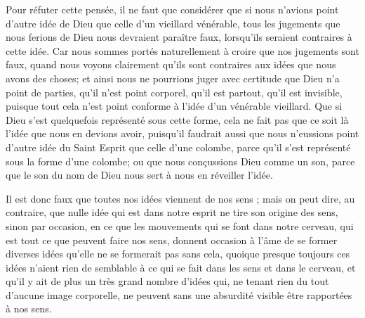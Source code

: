 Pour réfuter cette pensée, il ne faut que considérer que si nous n'avions point d'autre idée de Dieu que celle d'un vieillard vénérable, tous les jugements que nous ferions de Dieu nous devraient paraître faux, lorsqu'ils seraient contraires à cette idée. Car nous sommes portés naturellement à croire que nos jugements sont faux, quand nous voyons clairement qu'ils sont contraires aux idées que nous avons des choses; et ainsi nous ne pourrions juger avec certitude que Dieu n'a point de parties, qu'il n'est point corporel, qu'il est partout, qu'il est invisible, puisque tout cela n'est point conforme à l'idée d'un vénérable vieillard. Que si Dieu s'est quelquefois représenté sous cette forme, cela ne fait pas que ce soit là l'idée que nous en devions avoir, puisqu'il faudrait aussi que nous n'eussions point d'autre idée du Saint Esprit que celle d'une colombe, parce qu'il s'est représenté sous la forme d'une colombe; ou que nous conçussions Dieu comme un son, parce que le son du nom de Dieu nous sert à nous en réveiller l'idée.

Il est donc faux que toutes nos idées viennent de nos sens ; mais on peut dire, au contraire, que nulle idée qui est dans notre esprit ne tire son origine des sens, sinon par occasion, en ce que les mouvements qui se font dans notre cerveau, qui est tout ce que peuvent faire nos sens, donnent occasion à l'âme de se former diverses idées qu'elle ne se formerait pas sans cela, quoique presque toujours ces idées n'aient rien de semblable à ce qui se fait dans les sens et dans le cerveau, et qu'il y ait de plus un très grand nombre d'idées qui, ne tenant rien du tout d'aucune image corporelle, ne peuvent sans une absurdité visible être rapportées à nos sens.


